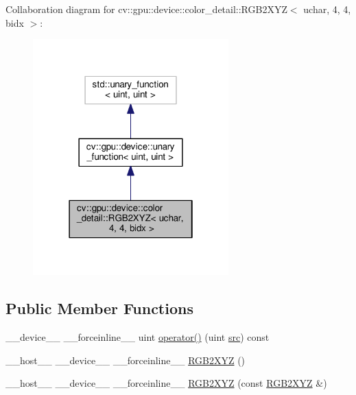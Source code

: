 Collaboration diagram for cv\-:\-:gpu\-:\-:device\-:\-:color\-\_\-detail\-:\-:R\-G\-B2\-X\-Y\-Z$<$ uchar, 4, 4, bidx $>$\-:\nopagebreak
\begin{figure}[H]
\begin{center}
\leavevmode
\includegraphics[width=214pt]{structcv_1_1gpu_1_1device_1_1color__detail_1_1RGB2XYZ_3_01uchar_00_014_00_014_00_01bidx_01_4__coll__graph}
\end{center}
\end{figure}
\subsection*{Public Member Functions}
\begin{DoxyCompactItemize}
\item 
\-\_\-\-\_\-device\-\_\-\-\_\- \-\_\-\-\_\-forceinline\-\_\-\-\_\- uint \hyperlink{structcv_1_1gpu_1_1device_1_1color__detail_1_1RGB2XYZ_3_01uchar_00_014_00_014_00_01bidx_01_4_a2a6132fd0d942590399a4fb083231e57}{operator()} (uint \hyperlink{legacy_8hpp_a371cd109b74033bc4366f584edd3dacc}{src}) const 
\item 
\-\_\-\-\_\-host\-\_\-\-\_\- \-\_\-\-\_\-device\-\_\-\-\_\- \-\_\-\-\_\-forceinline\-\_\-\-\_\- \hyperlink{structcv_1_1gpu_1_1device_1_1color__detail_1_1RGB2XYZ_3_01uchar_00_014_00_014_00_01bidx_01_4_abaaea9449e6a4c3e85cd3314f2305cb1}{R\-G\-B2\-X\-Y\-Z} ()
\item 
\-\_\-\-\_\-host\-\_\-\-\_\- \-\_\-\-\_\-device\-\_\-\-\_\- \-\_\-\-\_\-forceinline\-\_\-\-\_\- \hyperlink{structcv_1_1gpu_1_1device_1_1color__detail_1_1RGB2XYZ_3_01uchar_00_014_00_014_00_01bidx_01_4_a301fa169e458f2fa5a1ccc75e67b1178}{R\-G\-B2\-X\-Y\-Z} (const \hyperlink{structcv_1_1gpu_1_1device_1_1color__detail_1_1RGB2XYZ}{R\-G\-B2\-X\-Y\-Z} \&)
\end{DoxyCompactItemize}


